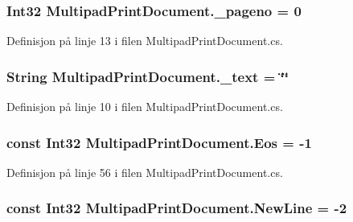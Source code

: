 \hypertarget{class_multipad_print_document_a1b6cabd162baf6ce1c5256059fa1e840}{
\subsubsection[{\+\_\+pageno}]{\setlength{\rightskip}{0pt plus 5cm}Int32 Multipad\+Print\+Document.\+\_\+pageno = 0\hspace{0.3cm}{\ttfamily [private]}}}\label{class_multipad_print_document_a1b6cabd162baf6ce1c5256059fa1e840}


Definisjon på linje 13 i filen Multipad\+Print\+Document.\+cs.

\hypertarget{class_multipad_print_document_ad8b42ce8bc5588c1a28b209c85dd8fa7}{
\subsubsection[{\+\_\+text}]{\setlength{\rightskip}{0pt plus 5cm}String Multipad\+Print\+Document.\+\_\+text = \char`\"{}\char`\"{}\hspace{0.3cm}{\ttfamily [private]}}}\label{class_multipad_print_document_ad8b42ce8bc5588c1a28b209c85dd8fa7}


Definisjon på linje 10 i filen Multipad\+Print\+Document.\+cs.

\hypertarget{class_multipad_print_document_adfd2fe48dc1a582ea58044a93dda2353}{
\subsubsection[{Eos}]{\setlength{\rightskip}{0pt plus 5cm}const Int32 Multipad\+Print\+Document.\+Eos = -\/1\hspace{0.3cm}{\ttfamily [private]}}}\label{class_multipad_print_document_adfd2fe48dc1a582ea58044a93dda2353}


Definisjon på linje 56 i filen Multipad\+Print\+Document.\+cs.

\hypertarget{class_multipad_print_document_a4a051275c8477606d5ef1d8f89cc54ca}{
\subsubsection[{New\+Line}]{\setlength{\rightskip}{0pt plus 5cm}const Int32 Multipad\+Print\+Document.\+New\+Line = -\/2\hspace{0.3cm}{\ttfamily [private]}}}\label{class_multipad_print_document_a4a051275c8477606d5ef1d8f89cc54ca}


